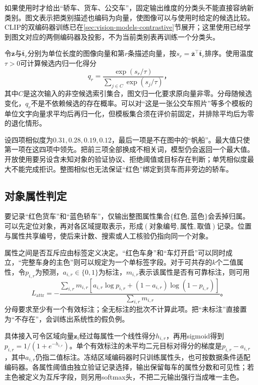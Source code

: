 如果使用时才给出“轿车、货车、公交车”，固定输出维度的分类头不能直接容纳新类别。图文表示把类别描述也编码为向量，使图像可以与使用时给定的候选比较。CLIP的双编码器训练已在\ref{sec:vision-models-contrastive}节展开；这里使用已经学到图文对应的两侧编码器及投影，不为当前类别表再训练一个分类头。

令$\bar{\bm{z}}$与$\bar{\bm{t}}_r$分别为单位长度的图像向量和第$r$条描述向量，按$s_r=\bar{\bm{z}}^\top\bar{\bm{t}}_r$排序。使用温度$\tau>0$可计算候选内归一化得分
\begin{equation}
 q_r=\frac{\exp(s_r/\tau)}
 {\sum_{j\in C}\exp(s_j/\tau)}\text{，}
 \label{eq:vision-clip-classification}
\end{equation}
其中$C$是这次输入的非空候选索引集合，图文归一化要求原向量非零。分母随候选变化，$q_r$不是不依赖候选的存在概率。可以对“这是一张公交车照片”等多个模板的单位文字向量求平均后再归一化，但模板集合须在评价前固定，并排除平均后为零的退化情形。

设四项相似度为$0.31,0.28,0.19,0.12$，最后一项是不在图中的“帆船”。最大值只使第一项在这四项中领先。把前三项全部换成不相关词，模型仍会返回一个最大值。开放使用要另设含未知对象的验证协议、拒绝阈值或目标存在判断；单凭相似度最大不能完成拒识。整图相似也无法保证“红色”绑定到货车而非旁边的轿车。

\subsection{对象属性判定}
\label{sec:vision-recognition-attributes}

要记录“红色货车”和“蓝色轿车”，仅输出整图属性集合$\{\text{红色},\text{蓝色}\}$会丢掉归属。可以先定位对象，再对各区域提取表示，形成$(\text{对象编号},\text{属性},\text{取值})$记录。位置与属性共享编号，使后来计数、搜索或人工核验仍指向同一个对象。

属性之间是否互斥应由标签定义决定。“红色车身”和“车灯开启”可以同时成立，“完整车身的主色”则可以规定为一个单标签字段。对于可共存的$k$个二值属性，令$p_{i,r}$为预测，$a_{i,r}\in\{0,1\}$为标注，$m_{i,r}$表示该属性是否有可靠标注，则可用
\begin{equation}
 L_{\mathrm{attr}}=
 -\frac{\sum_{i,r}m_{i,r}
 [a_{i,r}\log p_{i,r}+(1-a_{i,r})\log(1-p_{i,r})]}
 {\sum_{i,r}m_{i,r}}\text{。}
 \label{eq:vision-attribute-loss}
\end{equation}
分母要求至少有一个有效标注；全无标注的批次不计算此项。把“未标注”直接置为“不存在”，会训练出系统性的假负例。

具体接入可令区域向量$\bm{z}_i$经过每属性一个线性得分$h_{i,r}$，再用sigmoid得到$p_{i,r}=1/(1+e^{-h_{i,r}})$。单个有效标注的未平均二元目标对得分的梯度是$p_{i,r}-a_{i,r}$，其中$a_{i,r}$仍指二值标注。冻结区域编码器时只训练属性头，也可按数据条件适配编码器。各属性阈值由独立验证记录选择，输出保留每车的属性分数和可见性；若主色被定义为互斥字段，则另用softmax头，不把二元输出强行当成唯一主色。

